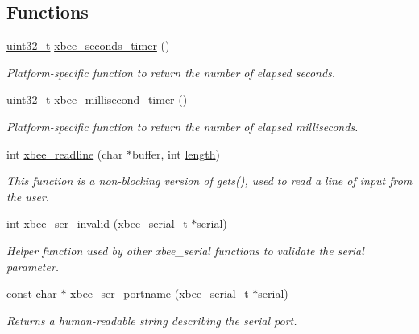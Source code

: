 \subsection*{Functions}
\begin{DoxyCompactItemize}
\item 
\hyperlink{group__hal__dos_ga09a1e304d66d35dd47daffee9731edaa}{uint32\-\_\-t} \hyperlink{group__hal__win32_gad66d00b144089426f04db771be5baa8b}{xbee\-\_\-seconds\-\_\-timer} ()
\begin{DoxyCompactList}\small\item\em Platform-\/specific function to return the number of elapsed seconds. \end{DoxyCompactList}\item 
\hyperlink{group__hal__dos_ga09a1e304d66d35dd47daffee9731edaa}{uint32\-\_\-t} \hyperlink{group__hal__win32_ga63bb246b86f72e88fa8ddc7a429c0e67}{xbee\-\_\-millisecond\-\_\-timer} ()
\begin{DoxyCompactList}\small\item\em Platform-\/specific function to return the number of elapsed milliseconds. \end{DoxyCompactList}\item 
int \hyperlink{group__hal__win32_ga8c0c80b64f63d395e718172190b21fcc}{xbee\-\_\-readline} (char $\ast$buffer, int \hyperlink{group__zdo_gab2b3adeb2a67e656ff030b56727fd0ac}{length})
\begin{DoxyCompactList}\small\item\em This function is a non-\/blocking version of gets(), used to read a line of input from the user. \end{DoxyCompactList}\item 
int \hyperlink{group__hal__win32_ga3c79f6b72b6cfc3cc5c4524450f661b9}{xbee\-\_\-ser\-\_\-invalid} (\hyperlink{structxbee__serial__t}{xbee\-\_\-serial\-\_\-t} $\ast$serial)
\begin{DoxyCompactList}\small\item\em Helper function used by other xbee\-\_\-serial functions to validate the {\itshape serial} parameter. \end{DoxyCompactList}\item 
const char $\ast$ \hyperlink{group__hal__win32_ga898057d1b7645785e7f3d6256828d039}{xbee\-\_\-ser\-\_\-portname} (\hyperlink{structxbee__serial__t}{xbee\-\_\-serial\-\_\-t} $\ast$serial)
\begin{DoxyCompactList}\small\item\em Returns a human-\/readable string describing the serial port. \end{DoxyCompactList}\item 

\end{DoxyCompactItemize}
